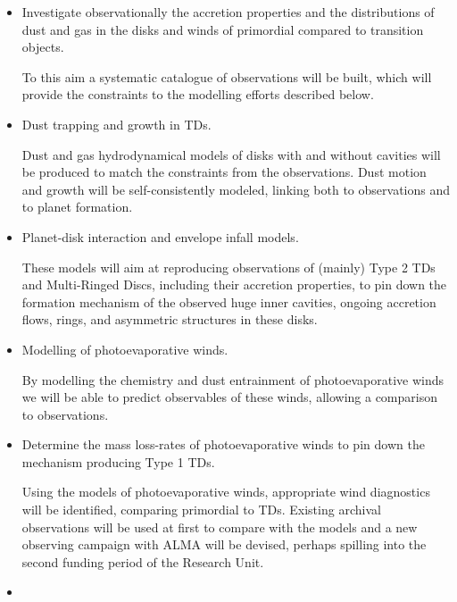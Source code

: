 \documentclass[10pt,fleqn,twoside,a4paper]{article}
\begin{document}
\begin{itemize}
\item
\begin{Emphasize}
  Investigate observationally the accretion properties and the distributions
  of dust and gas in the disks and winds of primordial compared to
  transition objects.
\end{Emphasize}
To this aim a systematic catalogue of observations will be built, 
which will provide the constraints to the modelling efforts described below. 
\item
\begin{Emphasize}
  Dust trapping and growth in TDs.
\end{Emphasize}
Dust and
gas hydrodynamical models of disks with and without cavities will be produced to match the
constraints from the observations. Dust motion and growth will be self-consistently
modeled, linking both to observations and to planet formation.  
\item
\begin{Emphasize}
  Planet-disk interaction and envelope infall models.
\end{Emphasize}
These models will aim at reproducing
observations of (mainly) Type 2 TDs and Multi-Ringed Discs, 
including their accretion properties, 
to pin down the formation mechanism of the observed huge inner cavities,
ongoing accretion flows, rings, and asymmetric structures in these disks.
\item
\begin{Emphasize}
  Modelling of photoevaporative winds.
\end{Emphasize}
By modelling the chemistry and dust entrainment of photoevaporative winds
we will be able to predict observables of these winds, allowing a comparison
to observations.
\item
\begin{Emphasize}
  Determine the mass loss-rates of photoevaporative winds to pin down the
  mechanism producing Type 1 TDs.
\end{Emphasize}
Using the models of photoevaporative winds, appropriate wind diagnostics 
will be identified, comparing primordial to
TDs. Existing archival observations will be used at first to compare
with the models and a new observing campaign with ALMA will be
devised, perhaps spilling into the second funding period of the Research Unit.
\item
\begin{Emphasize}

\end{Emphasize}
\end{itemize}
\end{document}
